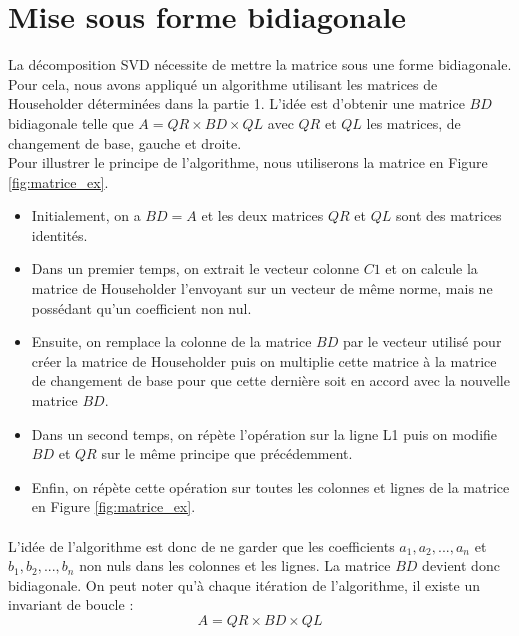 \documentclass{article}
\begin{document}
\section{Mise sous forme bidiagonale}

La décomposition SVD nécessite de mettre la matrice sous une forme bidiagonale. Pour cela, nous avons appliqué un algorithme utilisant les matrices de Householder déterminées dans la partie 1. L'idée est d'obtenir une matrice $BD$ bidiagonale telle que $A = QR \times BD \times QL$ avec $QR$ et $QL$ les matrices, de changement de base, gauche et droite. \\
Pour illustrer le principe de l'algorithme, nous utiliserons la matrice en Figure \ref{fig:matrice_ex}.
\begin{itemize}
    \item Initialement, on a $BD = A$ et les deux matrices $QR$ et $QL$ sont des matrices identités. 
    \item Dans un premier temps, on extrait le vecteur colonne $C1$ et on calcule la matrice de Householder l'envoyant sur un vecteur de même norme, mais ne possédant qu'un coefficient non nul.
    \item Ensuite, on remplace la colonne de la matrice $BD$ par le vecteur utilisé pour créer la matrice de Householder puis on multiplie cette matrice à la matrice de changement de base pour que cette dernière soit en accord avec la nouvelle matrice $BD$.
    \item Dans un second temps, on répète l'opération sur la ligne L1 puis on modifie $BD$ et $QR$ sur le même principe que précédemment. 
    \item Enfin, on répète cette opération sur toutes les colonnes et lignes de la matrice en Figure \ref{fig:matrice_ex}.
\end{itemize}
\paragraph{}
L'idée de l'algorithme est donc de ne garder que les coefficients $a_1, a_2, ..., a_n$ et $b_1, b_2, ..., b_n$ non nuls dans les colonnes et les lignes. La matrice $BD$ devient donc bidiagonale.
On peut noter qu'à chaque itération de l'algorithme, il existe un invariant de boucle : $$A = QR\times BD\times QL$$
\end{document}
